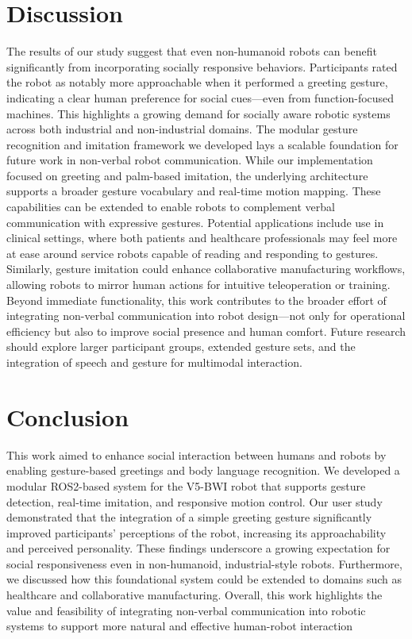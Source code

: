 \documentclass[conference]{IEEEtran}
\begin{document}
\section{Discussion}
The results of our study suggest that even non-humanoid robots can benefit significantly from incorporating socially responsive behaviors. Participants rated the robot as notably more approachable when it performed a greeting gesture, indicating a clear human preference for social cues—even from function-focused machines. This highlights a growing demand for socially aware robotic systems across both industrial and non-industrial domains. The modular gesture recognition and imitation framework we developed lays a scalable foundation for future work in non-verbal robot communication. While our implementation focused on greeting and palm-based imitation, the underlying architecture supports a broader gesture vocabulary and real-time motion mapping. These capabilities can be extended to enable robots to complement verbal communication with expressive gestures. Potential applications include use in clinical settings, where both patients and healthcare professionals may feel more at ease around service robots capable of reading and responding to gestures. Similarly, gesture imitation could enhance collaborative manufacturing workflows, allowing robots to mirror human actions for intuitive teleoperation or training. Beyond immediate functionality, this work contributes to the broader effort of integrating non-verbal communication into robot design—not only for operational efficiency but also to improve social presence and human comfort. Future research should explore larger participant groups, extended gesture sets, and the integration of speech and gesture for multimodal interaction.
\section{Conclusion}
This work aimed to enhance social interaction between humans and robots by enabling gesture-based greetings and body language recognition. We developed a modular ROS2-based system for the V5-BWI robot that supports gesture detection, real-time imitation, and responsive motion control. Our user study demonstrated that the integration of a simple greeting gesture significantly improved participants’ perceptions of the robot, increasing its approachability and perceived personality. These findings underscore a growing expectation for social responsiveness even in non-humanoid, industrial-style robots. Furthermore, we discussed how this foundational system could be extended to domains such as healthcare and collaborative manufacturing. Overall, this work highlights the value and feasibility of integrating non-verbal communication into robotic systems to support more natural and effective human-robot interaction



\end{document}
